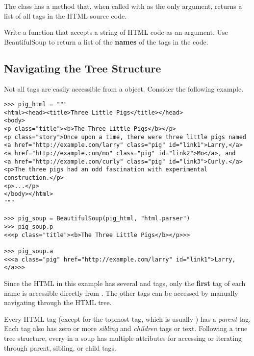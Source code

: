 \begin{problem} %
The  class has a  method that, when called with  as the only argument, returns a list of all tags in the HTML source code.

Write a function that accepts a string of HTML code as an argument.
Use BeautifulSoup to return a list of the \textbf{names} of the tags in the code.
\end{problem}

\subsection*{Navigating the Tree Structure} %

Not all tags are easily accessible from a  object.
Consider the following example.

\begin{lstlisting}
>>> pig_html = """
<html><head><title>Three Little Pigs</title></head>
<body>
<p class="title"><b>The Three Little Pigs</b></p>
<p class="story">Once upon a time, there were three little pigs named
<a href="http://example.com/larry" class="pig" id="link1">Larry,</a>
<a href="http://example.com/mo" class="pig" id="link2">Mo</a>, and
<a href="http://example.com/curly" class="pig" id="link3">Curly.</a>
<p>The three pigs had an odd fascination with experimental construction.</p>
<p>...</p>
</body></html>
"""

>>> pig_soup = BeautifulSoup(pig_html, "html.parser")
>>> pig_soup.p
<<<p class="title"><b>The Three Little Pigs</b></p>>>

>>> pig_soup.a
<<<a class="pig" href="http://example.com/larry" id="link1">Larry,</a>>>
\end{lstlisting}

Since the HTML in this example has several  and  tags, only the \textbf{first} tag of each name is accessible directly from .
The other tags can be accessed by manually navigating through the HTML tree.

Every HTML tag (except for the topmost tag, which is usually ) has a \emph{parent} tag.
Each tag also has zero or more \emph{sibling} and \emph{children} tags or text.
Following a true tree structure, every  in a soup has multiple attributes for accessing or iterating through parent, sibling, or child tags.

